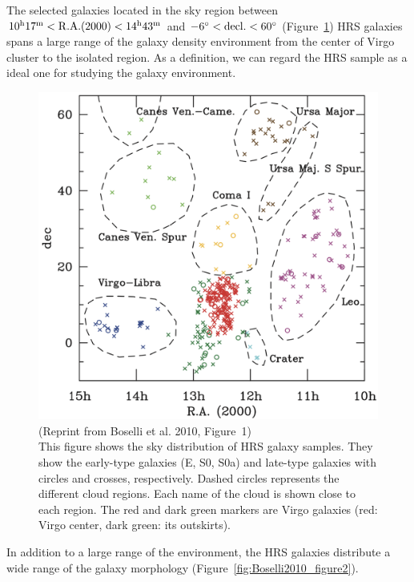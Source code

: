 The selected galaxies located in the sky region between $10^{\mathrm{h}}17^{\mathrm{m}}< \mathrm{R.A.}(2000) < 14^{\mathrm{h}}43^{\mathrm{m}}$ and $-6^{\circ} < \mathrm{decl.} < 60^{\circ}$ (Figure~\ref{fig:Boselli2010_figure1})
HRS galaxies spans a large range of the galaxy density environment from the center of Virgo cluster to the isolated region.
As a definition, we can regard the HRS sample as a ideal one for studying the galaxy environment.

\begin{figure}[htbp]
	\centering
	\includegraphics[width=.7\linewidth]{Chapter_3/Figures/Boselli2010_Figure1.png}
    \caption[Reprint from Boselli et al. 2010 (Figure~1)]{\label{fig:Boselli2010_figure1}
        (Reprint from Boselli et al. 2010, Figure~1)\\
        This figure shows the sky distribution of HRS galaxy samples.
        They show the early-type galaxies (E, S0, S0a) and late-type galaxies with circles and crosses, respectively.
        Dashed circles represents the different cloud regions. Each name of the cloud is shown close to each region.
        The red and dark green markers are Virgo galaxies (red: Virgo center, dark green: its outskirts).
    }
\end{figure}

In addition to a large range of the environment, the HRS galaxies distribute a wide range of the galaxy morphology (Figure~\ref{fig:Boselli2010_figure2}).

